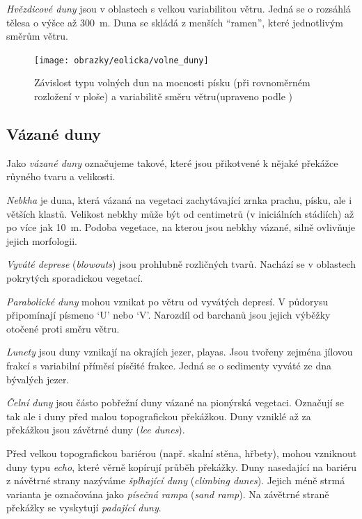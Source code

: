 \emph{Hvězdicové duny} jsou v oblastech s velkou variabilitou větru. Jedná se o rozsáhlá tělesa o výšce až \SI{300}{\metre}. Duna se skládá z menších \enquote{ramen}, které jednotlivým směrům větru.

\begin{figure}
	\centering
	\texttt{[image: obrazky/eolicka/volne\_duny]}
	\caption{Závislost typu volných dun na mocnosti písku (při rovnoměrném rozložení v ploše) a variabilitě směru větru(upraveno podle \textcite{wassonFactorsDeterminingDesert1983})}
	\label{fig:volneduny}
\end{figure}

\subsection{Vázané duny}
Jako \emph{vázané duny} označujeme takové, které jsou přikotvené k nějaké překážce růyného tvaru a velikosti.

\emph{Nebkha} je duna, která vázaná na vegetaci zachytávající zrnka prachu, písku, ale i větších klastů. Velikost nebkhy může být od centimetrů (v iniciálních stádiích) až po více jak \SI{10}{\metre}. Podoba vegetace, na kterou jsou nebkhy vázané, silně ovlivňuje jejich morfologii.

\emph{Vyváté deprese} (\textit{blowouts}) jsou prohlubně rozličných tvarů. Nachází se v oblastech pokrytých sporadickou vegetací.

\emph{Parabolické duny} mohou vznikat po větru od vyvátých depresí. V půdorysu připomínají písmeno \enquote*{U} nebo \enquote*{V}. Narozdíl od barchanů jsou jejich výběžky otočené proti směru větru.

\emph{Lunety} jsou duny vznikají na okrajích jezer, playas. Jsou tvořeny zejména jílovou frakcí s variabilní příměsí písčité frakce. Jedná se o sedimenty vyváté ze dna bývalých jezer.

\emph{Čelní duny} jsou částo pobřežní duny vázané na pionýrská vegetaci. Označují se tak ale i duny před malou topografickou překážkou. Duny vzniklé až za překážkou jsou závětrné duny (\textit{lee dunes}).

Před velkou topografickou bariérou (např. skalní stěna, hřbety),  mohou vzniknout duny typu \emph{echo}, které věrně kopírují průběh překážky. Duny nasedající na bariéru z návětrné strany nazýváme \emph{šplhající duny} (\textit{climbing dunes}). Jejich méně strmá varianta je označována jako \emph{písečná rampa} (\textit{sand ramp}). Na závětrné straně překážky se vyskytují \emph{padající duny}.

